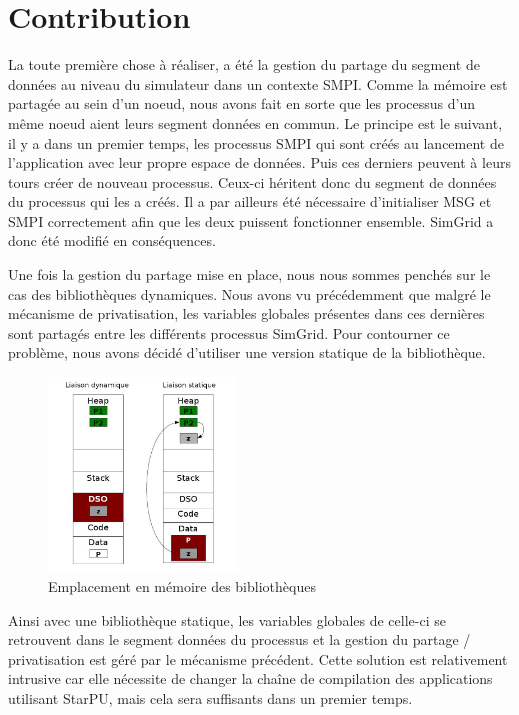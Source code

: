 \documentclass[smallextended]{svjour3}
\begin{document}
\section{Contribution}
\label{sec-5}
La toute première chose à réaliser, a été la gestion du partage du
segment de données au niveau du simulateur dans un contexte
SMPI. Comme la mémoire est partagée au sein d'un noeud, nous avons
fait en sorte que les processus d'un même noeud aient leurs segment
données en commun. Le principe est le suivant, il y a dans un
premier temps, les processus SMPI qui sont créés au lancement de
l'application avec leur propre espace de données. Puis ces derniers
peuvent à leurs tours créer de nouveau processus. Ceux-ci héritent
donc du segment de données du processus qui les a créés. Il a par
ailleurs été nécessaire d'initialiser MSG et SMPI
correctement afin que les deux puissent fonctionner
ensemble. SimGrid a donc été modifié en conséquences. 

Une fois la gestion du partage mise en place, nous nous sommes
penchés sur le cas des bibliothèques dynamiques. Nous avons vu
précédemment que malgré le mécanisme de privatisation, les variables
globales présentes dans ces dernières sont partagés entre les
différents processus SimGrid. Pour contourner ce problème, nous
avons décidé d'utiliser une version statique de la bibliothèque.  

\begin{figure}[htb]
\centering
\includegraphics[width=5cm]{./Img/StaticDyn.jpg}
\caption{\label{fig:3}Emplacement en mémoire des bibliothèques}
\end{figure}

Ainsi avec une bibliothèque statique, les variables globales de
celle-ci se retrouvent dans le segment données du processus et la
gestion du partage / privatisation est géré par le mécanisme
précédent. Cette solution est relativement intrusive car
elle nécessite de changer la chaîne de compilation des applications
utilisant StarPU, mais cela sera suffisants dans un premier temps. 
\end{document}
